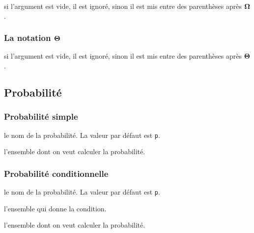 \documentclass[12pt,a4paper]{article}
\theoremstyle{definition}
\newcommand\extraspace{
	\vspace{0.25em}
}
\begin{document}

\IDarg{} si l'argument est vide, il est ignoré, sinon il est mis entre des parenthèses après $\bigomega{}$.





\subsubsection{\texorpdfstring{La notation $\bigtheta{}$}%
                          {La notation "grand Theta"}}


\IDarg{} si l'argument est vide, il est ignoré, sinon il est mis entre des parenthèses après $\bigtheta{}$.
\subsection{Probabilité}

\subsubsection{Probabilité \og simple \fg}


\IDoption{} le nom de la probabilité. La valeur par défaut est \verb+p+.

\IDarg{} l'ensemble dont on veut calculer la probabilité.





\subsubsection{Probabilité conditionnelle}



\extraspace




\IDoption{} le nom de la probabilité. La valeur par défaut est \verb+p+.

 l'ensemble qui donne la condition.

 l'ensemble dont on veut calculer la probabilité.


\end{document}
